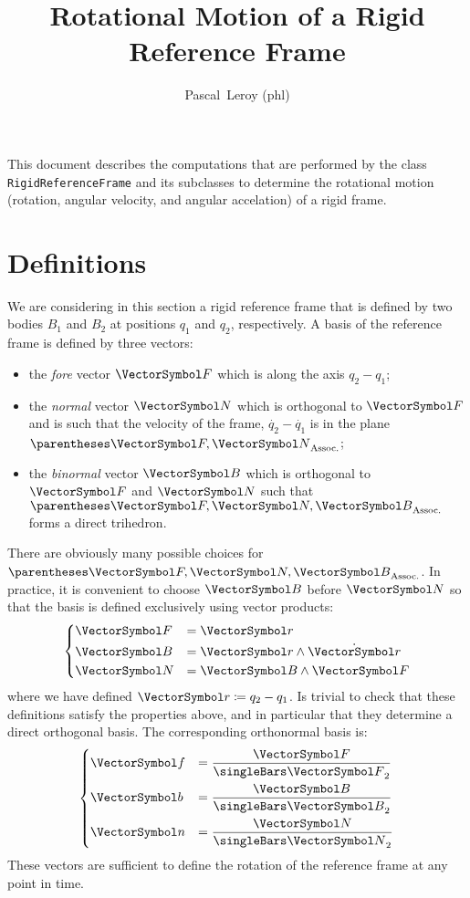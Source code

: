 \documentclass[10pt, a4paper, twoside]{basestyle}
\title{Rotational Motion of a Rigid Reference Frame}
\date{\printdate{2020-06-03}}
\author{Pascal~Leroy (phl)}
\begin{document}
\maketitle
\begin{sloppypar}
\noindent
This document describes the computations that are performed by the class \texttt{RigidReferenceFrame} and its subclasses to determine the rotational motion (rotation,
angular velocity, and angular accelation) of a rigid frame.
\end{sloppypar}

\section*{Definitions}
We are considering in this section a rigid reference frame that is defined by two bodies $B_1$ and $B_2$ at positions $q_1$ and $q_2$, respectively.  A basis of the reference frame is defined by three vectors:
\begin{itemize}
\item{the \emph{fore} vector $\vF$ which is along the axis $q_2 - q_1$;}
\item{the \emph{normal} vector $\vN$ which is orthogonal to $\vF$ and is such that the velocity of the frame, $\dot{q_2} - \dot{q_1}$ is in the plane $\pa{\vF, \vN}$;}
\item{the \emph{binormal} vector $\vB$ which is orthogonal to $\vF$ and $\vN$ such that $\pa{\vF, \vN, \vB}$ forms a direct trihedron.}
\end{itemize}
There are obviously many possible choices for $\pa{\vF, \vN, \vB}$.  In practice, it is convenient to choose $\vB$ before $\vN$ so that the basis is defined exclusively using vector products:
\begin{equation}
\begin{dcases}
\vF &= \vr \\
\vB &= \vr \wedge \dot{\vr} \\
\vN &= \vB \wedge \vF
\end{dcases}
\label{eqnFBN}
\end{equation}
where we have defined $\vr \DefineAs q_2 - q_1$.  Is trivial to check that these definitions satisfy the properties above, and in particular that they determine a direct orthogonal basis.  The corresponding orthonormal basis is:
\begin{equation}
\begin{dcases}
\vf &= \frac{\vF}{\norm\vF} \\
\vb &= \frac{\vB}{\norm\vB} \\
\vn &= \frac{\vN}{\norm\vN}
\end{dcases}
\label{eqnfbn}
\end{equation}
These vectors are sufficient to define the rotation of the reference frame at any point in time.
\end{document}
